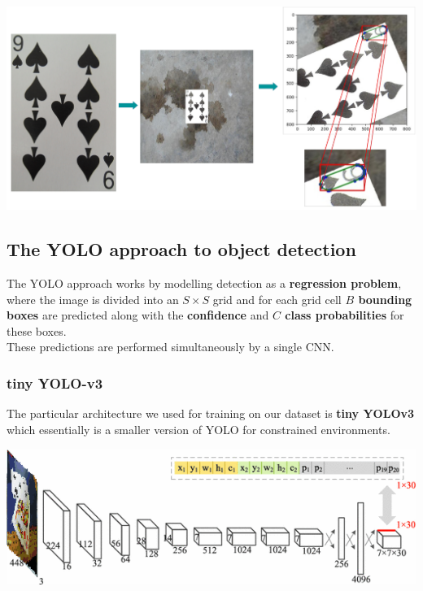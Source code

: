 \documentclass[a0,landscape]{a0poster}
\begin{document}
\begin{multicols}{3}
\vspace{1cm}
\begin{minipage}[b]{0.30\textwidth}
\includegraphics[width=\textwidth]{7-p}
\end{minipage}

\subsection*{The YOLO approach to object detection}
The YOLO approach works by modelling detection as a \textbf{regression problem}, where the image is divided into an $S\times S$ grid and for each grid cell \textbf{$B$ bounding boxes} are predicted along with the \textbf{confidence} and \textbf{$C$ class probabilities} for these boxes. \\
These predictions are performed simultaneously by a single CNN.
\subsubsection*{tiny YOLO-v3}

The particular architecture we used for training on our dataset is \textbf{tiny YOLOv3} which essentially is a smaller version of YOLO for constrained environments.
\begin{center}\vspace{1cm}
\includegraphics[width=0.9\linewidth]{tinyyolo}
\end{center}\vspace{1cm}

\end{multicols}
\end{document}

